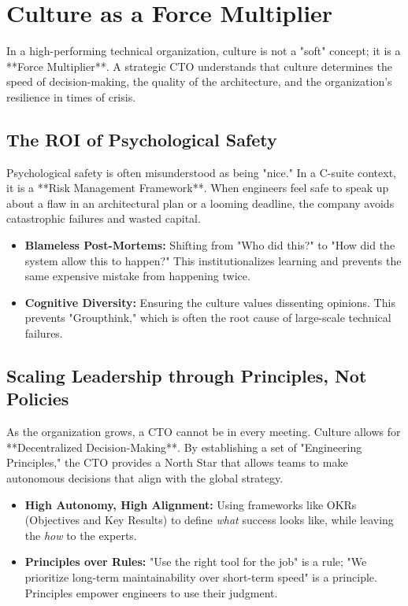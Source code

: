\section{Culture as a Force Multiplier}

In a high-performing technical organization, culture is not a "soft" concept; it is a **Force Multiplier**. A strategic CTO understands that culture determines the speed of decision-making, the quality of the architecture, and the organization's resilience in times of crisis.

\subsection{The ROI of Psychological Safety}

Psychological safety is often misunderstood as being "nice." In a C-suite context, it is a **Risk Management Framework**. When engineers feel safe to speak up about a flaw in an architectural plan or a looming deadline, the company avoids catastrophic failures and wasted capital.

\begin{itemize}
    \item \textbf{Blameless Post-Mortems:} Shifting from "Who did this?" to "How did the system allow this to happen?" This institutionalizes learning and prevents the same expensive mistake from happening twice.
    \item \textbf{Cognitive Diversity:} Ensuring the culture values dissenting opinions. This prevents "Groupthink," which is often the root cause of large-scale technical failures.
\end{itemize}

\subsection{Scaling Leadership through Principles, Not Policies}

As the organization grows, a CTO cannot be in every meeting. Culture allows for **Decentralized Decision-Making**. By establishing a set of "Engineering Principles," the CTO provides a North Star that allows teams to make autonomous decisions that align with the global strategy.

\begin{itemize}
    \item \textbf{High Autonomy, High Alignment:} Using frameworks like OKRs (Objectives and Key Results) to define \textit{what} success looks like, while leaving the \textit{how} to the experts.
    \item \textbf{Principles over Rules:} "Use the right tool for the job" is a rule; "We prioritize long-term maintainability over short-term speed" is a principle. Principles empower engineers to use their judgment.
\end{itemize}

